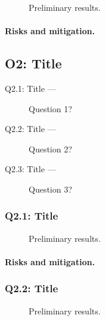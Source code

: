 \documentclass{nsf}
\begin{document}
\begin{wrapfigure}[14]{r}{.5\textwidth}
  \centering
  \caption{Preliminary results.}
  \label{fig:q13fig}
\end{wrapfigure}
\lipsum[1-3]
\paragraph{Risks and mitigation.}
\lipsum[4]

\subsection{O2: Title}
\label{sec:o2}

\lipsum[1]

\begin{questions}
  \begin{description}
  \item[Q2.1: Title —] Question 1?
  \item[Q2.2: Title —] Question 2?
  \item[Q2.3: Title —] Question 3?
  \end{description}
\end{questions}

\subsubsection{Q2.1: Title}
\label{sec:q21}

\begin{wrapfigure}[14]{r}{.5\textwidth}
  \centering
  \caption{Preliminary results.}
  \label{fig:q21fig}
\end{wrapfigure}
\lipsum[1-3]
\paragraph{Risks and mitigation.}
\lipsum[4]

\subsubsection{Q2.2: Title}
\label{sec:q22}

\begin{wrapfigure}[14]{r}{.5\textwidth}
  \centering
  \caption{Preliminary results.}
  \label{fig:q22fig}
\end{wrapfigure}
\lipsum[1-3]
\end{document}
